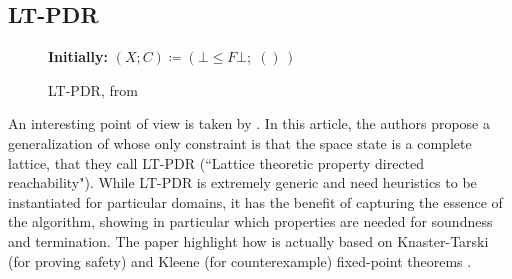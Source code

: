 \subsection{LT-PDR}\label{sec:sota:lt-pdr}
\begin{figure}[t]
	\textbf{Initially:} $(X; C) \coloneqq (\bot \leq F \bot;\; ()\,)$ \\
	\vspace{-1ex}
	\caption{LT-PDR, from \cite{KUKSH22}}\label{fig:sota:lt-pdr}
\end{figure}
An interesting point of view is taken by \cite{KUKSH22}. In this article, the authors propose a generalization of  whose only constraint is that the space state is a complete lattice, that they call LT-PDR (``Lattice theoretic property directed reachability"). While LT-PDR is extremely generic and need heuristics to be instantiated for particular domains, it has the benefit of capturing the essence of the algorithm, showing in particular which properties are needed for soundness and termination. The paper highlight how  is actually based on Knaster-Tarski (for proving safety) and Kleene (for counterexample) fixed-point theorems \cite{DP02}.
